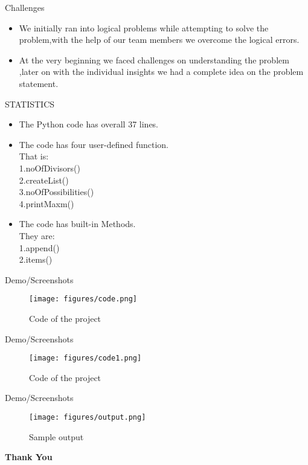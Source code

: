 \documentclass{beamer}
\begin{document}
\begin{frame}{\Huge Challenges}
\begin{itemize}
\Large
    \item We initially ran into logical problems while attempting to solve the 
          problem,with the help of our team members we overcome the logical
          errors.
    \item At the very beginning we faced challenges on understanding the problem ,later on with the individual insights we had a complete idea on the problem statement.
\end{itemize}



\end{frame}
\begin{frame}{\Huge STATISTICS}
\begin{itemize}
\Large
    \item The Python code has overall 37 lines.
    \item The code has four user-defined function.\\That  is:\\
    \hspace{0.8cm}1.noOfDivisors()\\
    \hspace{0.8cm}2.createList()\\
    \hspace{0.8cm}3.noOfPossibilities()\\
    \hspace{0.8cm}4.printMaxm()\\
    \item The code has built-in Methods.\\They are:\\
    \hspace{0.8cm}1.append()\\
    \hspace{0.8cm}2.items()\\  
\end{itemize}
    
\end{frame}
\begin{frame}{\Huge Demo/Screenshots}
\begin{figure}[htp]
  \centering
  \texttt{[image: figures/code.png]}
   \caption{Code of the project}
   \label{fig:code}
   \end{figure}

    
 \end{frame}
\begin{frame}{\Huge Demo/Screenshots}
\begin{figure}[htp]
  \centering
  \texttt{[image: figures/code1.png]}
   \caption{Code of the project}
   \label{fig:code2}
   \end{figure}

    
\end{frame}

\begin{frame}{\Huge Demo/Screenshots}
\begin{figure}[htp]
  \centering
  \texttt{[image: figures/output.png]}
   \caption{Sample output}
   \label{fig:output}
   \end{figure}

    
 \end{frame}
\begin{frame}{}
\centering
\textbf{\Huge Thank You}
    
\end{frame}
\end{document}

